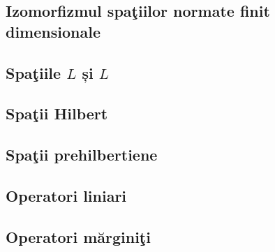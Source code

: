 \documentclass[a4paper,12pt]{article}
\theoremstyle{change}
\begin{document}
\subsection{Izomorfizmul spaţiilor normate finit dimensionale}

\subsection{Spaţiile $L$ și $L$}


\subsection{Spaţii  Hilbert}

\subsection{Spaţii prehilbertiene}


\subsection{Operatori liniari}

\subsection{Operatori mărginiţi}

\end{document}
